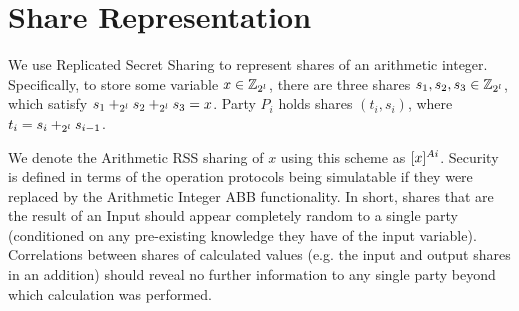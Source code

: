 \section{Share Representation}

We use Replicated Secret Sharing to represent shares of an arithmetic integer.
Specifically, to store some variable $x \in \mathbb{Z}_{2^l}$, there are three shares $s_1, s_2, s_3 \in \mathbb{Z}_{2^l}$, which satisfy $s_1 +_{2^l} s_2 +_{2^l} s_3 = x$.
Party $P_i$ holds shares $(t_i, s_i)$, where $t_i = s_i +_{2^l} s_{i - 1}$.

We denote the Arithmetic RSS sharing of $x$ using this scheme as $[x]^{Ai}$. Security is defined in terms of the operation protocols being simulatable if they were replaced by the Arithmetic Integer ABB functionality.
In short, shares that are the result of an Input should appear completely random to a single party (conditioned on any pre-existing knowledge they have of the input variable).
Correlations between shares of calculated values (e.g. the input and output shares in an addition) should reveal no further information to any single party beyond which calculation was performed.
